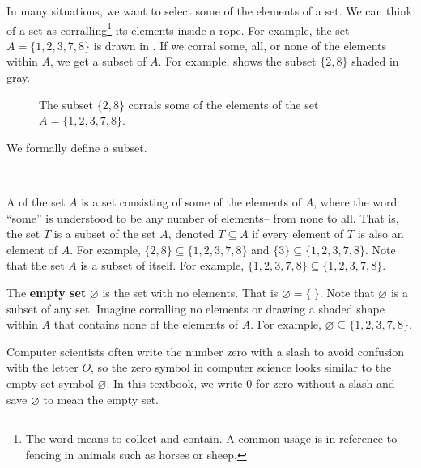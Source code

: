 In many situations, we want to select some of the elements of a set.  We can think of a set as corralling\footnote{The word  means to collect and contain.  A common usage is in reference to fencing in animals such as horses or sheep.} its elements inside a rope.  For example, the set $A=\{1,2,3,7,8\}$ is drawn in .  If we corral some, all, or none of the elements within $A$, we get a subset of $A$.  For example,  shows the subset $\{2,8\}$ shaded in gray.

\begin{figure}[ht]
    \centering
    
    \caption{The subset $\{2,8\}$ corrals some of the elements of the set $A=\{1,2,3,7,8\}$.}
        \label{fig_subset_corral}
\end{figure}

We formally define a subset.

\begin{defn}[Subsets]
\label{defn_subsets}
~
    \begin{apart}
        \item A  of the set $A$ is a set consisting of some of the elements of $A$, where the word ``some'' is understood to be any number of elements-- from none to all. That is, the set $T$ is a subset of the set $A$, denoted $T \subseteq A$ if every element of $T$ is also an element of $A$.  For example, $\{2,8\} \subseteq \{1,2,3,7,8\}$ and $\{3\} \subseteq \{1,2,3,7,8\}$. Note that the set $A$ is a subset of itself.  For example, $\{1,2,3,7,8\} \subseteq \{1,2,3,7,8\}$.
        
        \item The \textbf{empty set} $\varnothing$ is the set with no elements. That is $\varnothing=\{ ~\}$. 
        Note that $\varnothing$ is a subset of any set. Imagine corralling no elements or drawing a shaded shape within $A$ that contains none of the elements of $A$. For example, $\varnothing \subseteq \{1,2,3,7,8\}$.  
    \end{apart}
\end{defn}

\begin{rem}
\label{rem_notation_zero}
   Computer scientists often write the number zero with a slash to avoid confusion with the letter $O$, so the zero symbol in computer science looks similar to the empty set symbol $\varnothing$.  In this textbook, we write $0$ for zero without a slash and save $\varnothing$ to mean the empty set.
\end{rem} 

